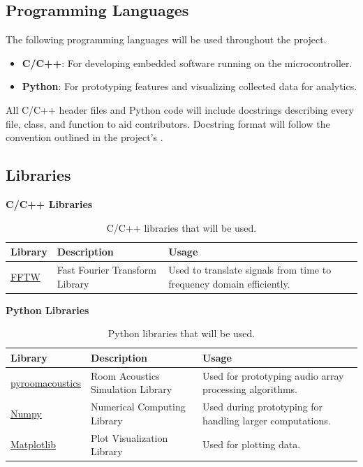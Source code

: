 \documentclass{article}
\begin{document}
\subsection{Programming Languages}
The following programming languages will be used throughout the project.
\begin{itemize}
  \item \textbf{C/C++}: For developing embedded software running on the
  microcontroller.
  \item \textbf{Python}: For prototyping features and visualizing collected data
  for analytics.
\end{itemize}

All C/C++ header files and Python code will include docstrings describing every
file, class, and function to aid contributors. Docstring format will follow the
convention outlined in the project's .

\subsection{Libraries}

\textbf{C/C++ Libraries}
\begin{table}[h!]
\centering
\begin{tabularx}{\textwidth}{|l|X|X|}
\hline
\textbf{Library} & \textbf{Description} & \textbf{Usage} \\ \hline
\href{https://www.fftw.org/}{FFTW} & Fast Fourier Transform Library & Used to
translate signals from time to frequency domain efficiently. \\ \hline
\end{tabularx}
\caption{C/C++ libraries that will be used.}
\end{table}

\textbf{Python Libraries}
\begin{table}[h!]
\centering
\begin{tabularx}{\textwidth}{|l|X|X|}
\hline
\textbf{Library} & \textbf{Description} & \textbf{Usage} \\ \hline
\href{https://pypi.org/project/pyroomacoustics/}{pyroomacoustics} & Room Acoustics
Simulation Library  & Used for prototyping audio array processing algorithms. \\
\hline
\href{https://numpy.org/}{Numpy} & Numerical Computing Library  & Used during
prototyping for handling larger computations. \\ \hline
\href{https://matplotlib.org/}{Matplotlib} & Plot Visualization Library  & Used
for plotting data. \\ \hline
\end{tabularx}
\caption{Python libraries that will be used.}
\end{table}
\end{document}
